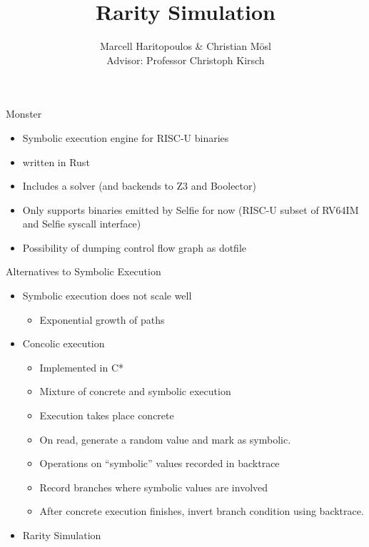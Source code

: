 \documentclass[10pt]{beamer}
\title{Rarity Simulation}
\date{}
\author{Marcell Haritopoulos \& Christian Mösl \\
Advisor: Professor Christoph Kirsch}
\begin{document}
\maketitle

\begin{frame}{Monster}
    \begin{itemize}
		\item Symbolic execution engine for RISC-U binaries
    \item written in Rust
		\item Includes a solver (and backends to Z3 and Boolector)
		\item Only supports binaries emitted by Selfie for now (RISC-U subset of RV64IM and Selfie syscall interface)
		\item Possibility of dumping control flow graph as dotfile
    \end{itemize}
\end{frame}

\begin{frame}{Alternatives to Symbolic Execution}
	\begin{itemize}
		\item Symbolic execution does not scale well
			\begin{itemize}
				\item Exponential growth of paths
			\end{itemize}
		\item Concolic execution
			\begin{itemize}
				\item Implemented in C*
				\item Mixture of concrete and symbolic execution
				\item Execution takes place concrete
				\item On read, generate a random value and mark as symbolic.
				\item Operations on \enquote{symbolic} values recorded in backtrace
				\item Record branches where symbolic values are involved
				\item After concrete execution finishes, invert branch condition using backtrace.
			\end{itemize}
		\item Rarity Simulation
	\end{itemize}
\end{frame}
\end{document}
